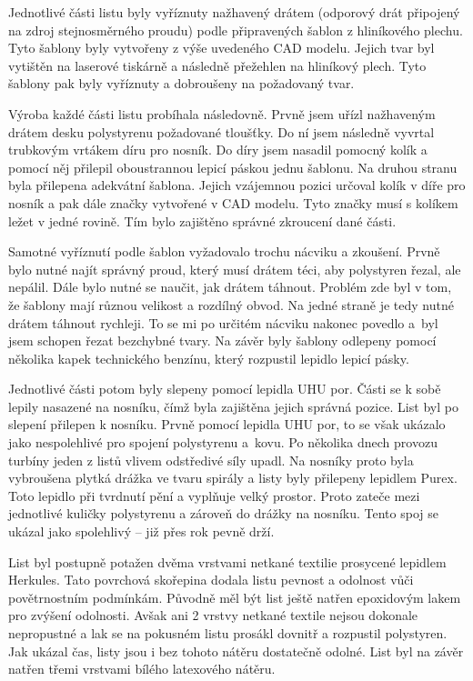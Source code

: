 Jednotlivé části listu byly vyříznuty nažhavený drátem (odporový drát připojený na zdroj stejnosměrného proudu) podle připravených šablon z hliníkového plechu. Tyto šablony byly vytvořeny z výše uvedeného CAD modelu. Jejich tvar byl vytištěn na laserové tiskárně a následně přežehlen na hliníkový plech. Tyto šablony pak byly vyříznuty a dobroušeny na požadovaný tvar.

Výroba každé části listu probíhala následovně. Prvně jsem uřízl nažhaveným drátem desku polystyrenu požadované tloušťky. Do ní jsem následně vyvrtal trubkovým vrtákem díru pro nosník. Do díry jsem nasadil pomocný kolík a pomocí něj přilepil oboustrannou lepicí páskou jednu šablonu. Na druhou stranu byla přilepena adekvátní šablona. Jejich vzájemnou pozici určoval kolík v díře pro nosník a pak dále značky vytvořené v CAD modelu. Tyto značky musí s kolíkem ležet v jedné rovině. Tím bylo zajištěno správné zkroucení dané části.

Samotné vyříznutí podle šablon vyžadovalo trochu nácviku a zkoušení. Prvně bylo nutné najít správný proud, který musí drátem téci, aby polystyren řezal, ale nepálil. Dále bylo nutné se naučit, jak drátem táhnout. Problém zde byl v tom, že šablony mají různou velikost a rozdílný obvod. Na jedné straně je tedy nutné drátem táhnout rychleji. To se mi po určitém nácviku nakonec povedlo a~byl jsem schopen řezat bezchybné tvary. Na závěr byly šablony odlepeny pomocí několika kapek technického benzínu, který rozpustil lepidlo lepicí pásky.

Jednotlivé části potom byly slepeny pomocí lepidla UHU por. Části se k sobě lepily nasazené na nosníku, čímž byla zajištěna jejich správná pozice. List byl po slepení přilepen k nosníku. Prvně pomocí lepidla UHU por, to se však ukázalo jako nespolehlivé pro spojení polystyrenu a~kovu. Po několika dnech provozu turbíny jeden z listů vlivem odstředivé síly upadl. Na nosníky proto byla vybroušena plytká drážka ve tvaru spirály a listy byly přilepeny lepidlem Purex. Toto lepidlo při tvrdnutí pění a vyplňuje velký prostor. Proto zateče mezi jednotlivé kuličky polystyrenu a zároveň do drážky na nosníku. Tento spoj se ukázal jako spolehlivý – již přes rok pevně drží.

List byl postupně potažen dvěma vrstvami netkané textilie prosycené lepidlem Herkules. Tato povrchová skořepina dodala listu pevnost a odolnost vůči povětrnostním podmínkám. Původně měl být list ještě natřen epoxidovým lakem pro zvýšení odolnosti. Avšak ani 2 vrstvy netkané textile nejsou dokonale nepropustné a lak se na pokusném listu prosákl dovnitř a rozpustil polystyren. Jak ukázal čas, listy jsou i bez tohoto nátěru dostatečně odolné. List byl na závěr natřen třemi vrstvami bílého latexového nátěru.

